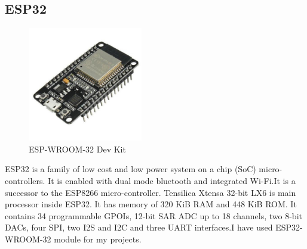 \subsection{ESP32} 
\begin{figure}[h!]
\centering
\includegraphics[width=5cm]{./Figures/ESP32.jpg}
\caption{ESP-WROOM-32 Dev Kit}
\label{ESP32}
\end{figure}
\par  ESP32 is a family of low cost and low power system on a chip (SoC) micro-controllers. It is enabled with dual mode bluetooth and integrated Wi-Fi.It is a successor to the ESP8266 micro-controller. Tensilica Xtensa 32-bit LX6 is main processor inside ESP32. It has memory of 320 KiB RAM and 448 KiB ROM. It contains 34 programmable GPOIs, 12-bit SAR ADC up to 18 channels, two 8-bit DACs, four SPI, two I2S and I2C and three UART interfaces.I have used ESP32-WROOM-32 module for my projects.



